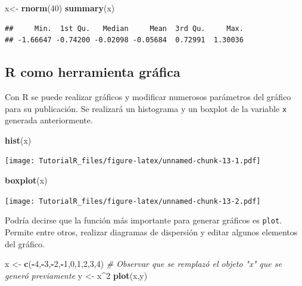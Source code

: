 \documentclass[]{book}
\newenvironment{Shaded}{\begin{snugshade}}{\end{snugshade}}
\newcommand{\KeywordTok}[1]{\textcolor[rgb]{0.13,0.29,0.53}{\textbf{#1}}}
\newcommand{\DecValTok}[1]{\textcolor[rgb]{0.00,0.00,0.81}{#1}}
\newcommand{\StringTok}[1]{\textcolor[rgb]{0.31,0.60,0.02}{#1}}
\newcommand{\CommentTok}[1]{\textcolor[rgb]{0.56,0.35,0.01}{\textit{#1}}}
\newcommand{\OperatorTok}[1]{\textcolor[rgb]{0.81,0.36,0.00}{\textbf{#1}}}
\newcommand{\NormalTok}[1]{#1}
\begin{document}
\begin{Shaded}
\begin{Highlighting}[]
\NormalTok{x<-}\StringTok{ }\KeywordTok{rnorm}\NormalTok{(}\DecValTok{40}\NormalTok{)}
\KeywordTok{summary}\NormalTok{(x)}
\end{Highlighting}
\end{Shaded}

\begin{verbatim}
##     Min.  1st Qu.   Median     Mean  3rd Qu.     Max. 
## -1.66647 -0.74200 -0.02098 -0.05684  0.72991  1.30036
\end{verbatim}

\hypertarget{r-como-herramienta-grafica}{%
\subsection{R como herramienta
gráfica}\label{r-como-herramienta-grafica}}

Con R se puede realizar gráficos y modificar numerosos parámetros del
gráfico para su publicación. Se realizará un histograma y un boxplot de
la variable \texttt{x} generada anteriormente.

\begin{Shaded}
\begin{Highlighting}[]
\KeywordTok{hist}\NormalTok{(x)}
\end{Highlighting}
\end{Shaded}

\texttt{[image: TutorialR\_files/figure-latex/unnamed-chunk-13-1.pdf]}

\begin{Shaded}
\begin{Highlighting}[]
\KeywordTok{boxplot}\NormalTok{(x)}
\end{Highlighting}
\end{Shaded}

\texttt{[image: TutorialR\_files/figure-latex/unnamed-chunk-13-2.pdf]}

Podría decirse que la función más importante para generar gráficos es
\texttt{plot}. Permite entre otros, realizar diagramas de dispersión y
editar algunos elementos del gráfico.

\begin{Shaded}
\begin{Highlighting}[]
\NormalTok{x <-}\StringTok{ }\KeywordTok{c}\NormalTok{(}\OperatorTok{-}\DecValTok{4}\NormalTok{,}\OperatorTok{-}\DecValTok{3}\NormalTok{,}\OperatorTok{-}\DecValTok{2}\NormalTok{,}\OperatorTok{-}\DecValTok{1}\NormalTok{,}\DecValTok{0}\NormalTok{,}\DecValTok{1}\NormalTok{,}\DecValTok{2}\NormalTok{,}\DecValTok{3}\NormalTok{,}\DecValTok{4}\NormalTok{)  }\CommentTok{# Observar que se remplazó el objeto "x" que se generó previamente}
\NormalTok{y <-}\StringTok{ }\NormalTok{x}\OperatorTok{^}\DecValTok{2}
\KeywordTok{plot}\NormalTok{(x,y)}
\end{Highlighting}
\end{Shaded}
\end{document}
